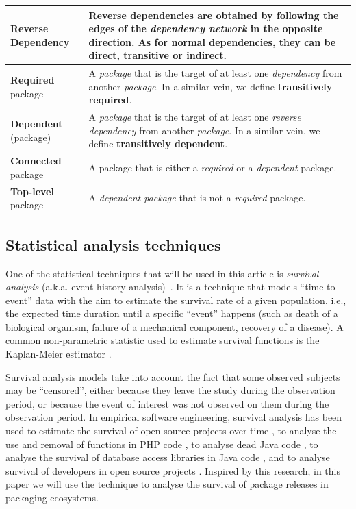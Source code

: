 \documentclass[smallextended]{svjour3}       %
\newcommand{\ie}{i.e.,\xspace}
\begin{document}
\begin{table}[!htbp]
\begin{tabular}{p{1.85cm}|p{9.15cm}}
 \bf Reverse \quad Dependency & Reverse dependencies are obtained by following the edges of the \emph{dependency network} in the opposite direction. As for normal dependencies, they can be \textbf{direct}, \textbf{transitive} or \textbf{indirect}. \\  \hline
  {\bf Required} \quad package & A \emph{package} that is the target of at least one \emph{dependency} from another \emph{package}. In a similar vein, we define {\bf transitively required}.\\  \hline
  {\bf Dependent} \quad (package) & A \emph{package} that is the target of at least one \emph{reverse dependency} from another \emph{package}. In a similar vein, we define {\bf transitively dependent}. \\  \hline
  {\bf Connected} \quad package & A package that is either a \emph{required} or a \emph{dependent} package. \\  \hline
  {\bf Top-level} \quad package & A \emph{dependent package} that is not a \emph{required} package.
  \end{tabular}
\end{table}

\subsection{Statistical analysis techniques}

One of the statistical techniques that will be used in this article is \emph{survival analysis} (a.k.a. event history analysis)~\cite{Aalen2008}.
It is a technique that models ``time to event'' data with the aim to estimate the survival rate of a given population, \ie the expected time duration until a specific ``event'' happens (such as death of a biological organism, failure of a mechanical component, recovery of a disease). A common non-parametric statistic used to estimate survival functions is the Kaplan-Meier estimator \cite{KaplanMeier2012}.

Survival analysis models take into account the fact that some observed subjects may be ``censored'', either because they leave the study during the observation period, or because the event of interest was not observed on them during the observation period.
In empirical software engineering, survival analysis has been used to estimate the survival of open source projects over time \cite{Samoladas2010}, to analyse the use and removal of functions in PHP code \cite{Kyriakakis2014}, to analyse dead Java code \cite{Scanniello2011}, to analyse the survival of database access libraries in Java code \cite{GoeminnetEtAl2015-ICSME,Decan2017-CEUR}, and to analyse survival of developers in open source projects \cite{Lin2017}. Inspired by this research, in this paper we will use the technique to analyse the survival of package releases in packaging ecosystems.
\end{document}
